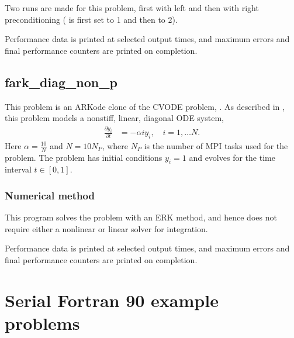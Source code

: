 \documentclass[letterpaper,10pt,english]{sphinxmanual}
\begin{document}
Two runs are made for this problem, first with left and then with
right preconditioning ( is first set to 1 and then to 2).

Performance data is printed at selected output times, and maximum
errors and final performance counters are printed on completion.


\section{fark\_diag\_non\_p}
\label{\detokenize{f77_parallel:id3}}\label{\detokenize{f77_parallel:fark-diag-non-p}}
This problem is an ARKode clone of the CVODE problem,
.  As described in \label{\detokenize{f77_parallel:id4}}{\hyperref[\detokenize{References:hsr2017}]{\sphinxcrossref{{[}HSR2017{]}}}}, this problem models a
nonstiff, linear, diagonal ODE system,
\begin{equation*}
\begin{split}\frac{\partial y_i}{\partial t} &= -\alpha i y_i, \quad i=1,\ldots N.\end{split}
\end{equation*}
Here \(\alpha=\frac{10}{N}\) and \(N=10 N_P\), where \(N_P\) is the
number of MPI tasks used for the problem.  The problem has initial
conditions \(y_i=1\) and evolves for the time interval \(t\in [0,1]\).


\subsection{Numerical method}
\label{\detokenize{f77_parallel:id5}}
This program solves the problem with an ERK method, and hence does not
require either a nonlinear or linear solver for integration.

Performance data is printed at selected output times, and maximum
errors and final performance counters are printed on completion.


\chapter{Serial Fortran 90 example problems}
\label{\detokenize{f90_serial:serial-fortran-90-example-problems}}\label{\detokenize{f90_serial::doc}}\label{\detokenize{f90_serial:serial-f90}}
\end{document}
